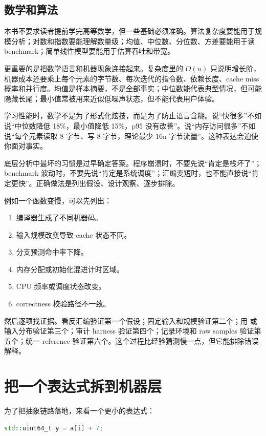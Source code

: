 \subsection{数学和算法}

本书不要求读者提前学完高等数学，但一些基础必须准确。算法复杂度要能用于规模分析；对数和指数要能理解数量级；均值、中位数、分位数、方差要能用于读 benchmark；简单线性模型要能用于估算吞吐和带宽。

更重要的是把数学语言和机器现象连接起来。复杂度里的 $O(n)$ 只说明增长阶，机器成本还要乘上每个元素的字节数、每次迭代的指令数、依赖长度、cache miss 概率和并行度。均值是样本摘要，不是全部事实；中位数能代表典型情况，但可能隐藏长尾；最小值常被用来近似低噪声状态，但不能代表用户体验。

学习性能时，数学不是为了形式化炫技，而是为了防止语言含糊。说“快很多”不如说“中位数降低 18\%，最小值降低 15\%，p95 没有改善”。说“内存访问很多”不如说“每个元素读取 8 字节、写 8 字节，理论最少 16n 字节流量”。这种表达会迫使你面对事实。

底层分析中最坏的习惯是过早确定答案。程序崩溃时，不要先说“肯定是栈坏了”；benchmark 波动时，不要先说“肯定是系统调度”；汇编变短时，也不能直接说“肯定更快”。正确做法是列出假设、设计观察、逐步排除。

例如一个函数变慢，可以先列出：

\begin{enumerate}
  \item 编译器生成了不同机器码。
  \item 输入规模改变导致 cache 状态不同。
  \item 分支预测命中率下降。
  \item 内存分配或初始化混进计时区域。
  \item CPU 频率或调度状态改变。
  \item correctness 校验路径不一致。
\end{enumerate}

然后逐项找证据。看反汇编验证第一个假设；固定输入和规模验证第二个；用  或输入分布验证第三个；审计 harness 验证第四个；记录环境和 raw samples 验证第五个；统一 reference 验证第六个。这个过程比经验猜测慢一点，但它能排除错误解释。

\section{把一个表达式拆到机器层}

为了把抽象链路落地，来看一个更小的表达式：

\begin{lstlisting}[language=C++]
std::uint64_t y = a[i] + 7;
\end{lstlisting}

